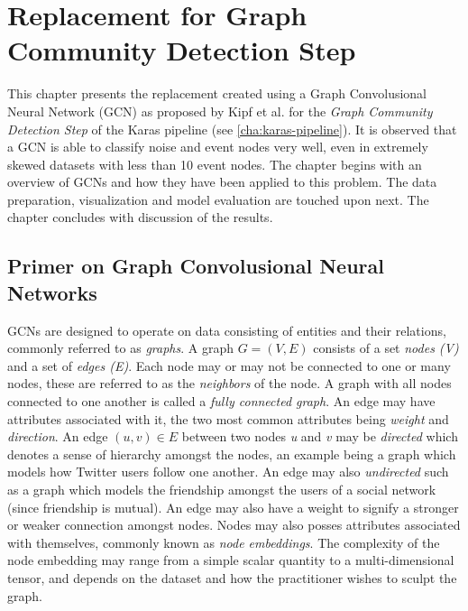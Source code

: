 
\chapter{Replacement for Graph Community Detection Step} %
\label{cha:gcn}
% 

This chapter presents the replacement created using a Graph
Convolusional Neural Network (GCN) as proposed by Kipf et al. for the
\emph{Graph Community Detection Step} of the Karas pipeline (see
\ref{cha:karas-pipeline}). It is observed that a GCN is able to
classify noise and event nodes very well, even in extremely skewed
datasets with less than 10 event nodes. The chapter begins with an
overview of GCNs and how they have been applied to this problem. The
data preparation, visualization and model evaluation are touched upon
next. The chapter concludes with discussion of the results.

\section{Primer on Graph Convolusional Neural Networks}
\label{sec:gcn-primer}

GCNs are designed to operate on data consisting of entities and their
relations, commonly referred to as \emph{graphs}. A graph $G = (V, E)$
consists of a set \emph{nodes (V)} and a set of \emph{edges (E)}. Each
node may or may not be connected to one or many nodes, these are
referred to as the \emph{neighbors} of the node. A graph with all
nodes connected to one another is called a \emph{fully connected
graph}. An edge may have attributes associated with it, the two most
common attributes being \emph{weight} and \emph{direction}. An edge
$(u, v) \in E$ between two nodes \emph{u} and \emph{v} may be
\emph{directed} which denotes a sense of hierarchy amongst the nodes,
an example being a graph which models how Twitter users follow one
another. An edge may also \emph{undirected} such as a graph which
models the friendship amongst the users of a social network (since
friendship is mutual). An edge may also have a weight to signify a
stronger or weaker connection amongst nodes. Nodes may also posses
attributes associated with themselves, commonly known as \emph{node
embeddings}. The complexity of the node embedding may range from a
simple scalar quantity to a multi-dimensional tensor, and depends on
the dataset and how the practitioner wishes to sculpt the graph.

